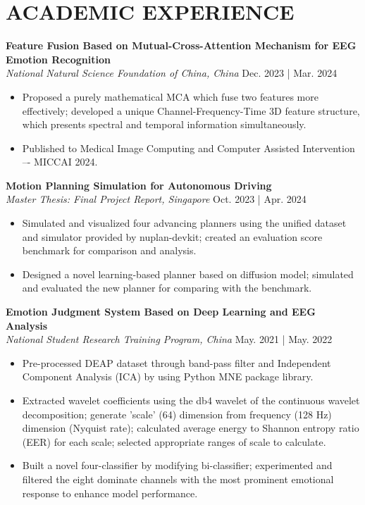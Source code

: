 \documentclass[a4paper,9pt]{extarticle}
\begin{document}
\nocite{*}



\section*{ACADEMIC EXPERIENCE}

\noindent
\textbf{Feature Fusion Based on Mutual-Cross-Attention Mechanism for EEG Emotion Recognition} \\ %
\textit{National Natural Science Foundation of China, China} \hfill Dec. 2023 | Mar. 2024
\begin{itemize}
    \item Proposed a purely mathematical MCA which fuse two features more effectively; developed a unique Channel-Frequency-Time 3D feature structure, which presents spectral and temporal information simultaneously. 
    \item Published to Medical Image Computing and Computer Assisted Intervention –- MICCAI 2024.
\end{itemize}

\noindent
\textbf{Motion Planning Simulation for Autonomous Driving} \\ %
\textit{Master Thesis: Final Project Report, Singapore} \hfill Oct. 2023 | Apr. 2024 %
\begin{itemize}
    \item Simulated and visualized four advancing planners using the unified dataset and simulator provided by nuplan-devkit; created an evaluation score benchmark for comparison and analysis.
    \item Designed a novel learning-based planner based on diffusion model; simulated and evaluated the new planner for comparing with the benchmark.
\end{itemize}

\noindent
\textbf{Emotion Judgment System Based on Deep Learning and EEG Analysis} \\ %
\textit{National Student Research Training Program, China} \hfill May. 2021 | May. 2022 %
\begin{itemize}
    \item Pre-processed DEAP dataset through band-pass filter and Independent Component Analysis (ICA) by using Python MNE package library.
    \item Extracted wavelet coefficients using the db4 wavelet of the continuous wavelet decomposition; generate 'scale' (64) dimension from frequency (128 Hz) dimension (Nyquist rate); calculated average energy to Shannon entropy ratio (EER) for each scale; selected appropriate ranges of scale to calculate.
    \item Built a novel four-classifier by modifying bi-classifier; experimented and filtered the eight dominate channels with the most prominent emotional response to enhance model performance.
\end{itemize}
\end{document}
